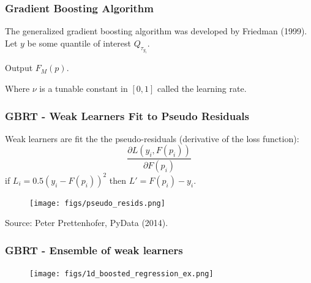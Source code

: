 \documentclass[t, pdftex]{beamer}
\begin{document}
\begin{frame}[shrink=20]
\frametitle{Gradient Boosting Algorithm}

The generalized gradient boosting algorithm was developed by Friedman (1999).
Let $y$ be some quantile of interest $Q_{\tau_{y_i}}$.
\begin{algorithm}[H]

Output $F_M(p).$
\end{algorithm}
Where $\nu$ is a tunable constant in $[0, 1]$ called the learning rate.
\end{frame}

\begin{frame}[noframenumbering]
\frametitle{GBRT - Weak Learners Fit to Pseudo Residuals}
Weak learners are fit the the pseudo-residuals (derivative of the loss function): 
\[
\frac{\partial L(y_i, F(p_i))}{\partial F(p_i)}
\]
if $L_i=0.5(y_i-F(p_i))^2$ then $L' = F(p_i)-y_i$.  
\begin{figure}[!htbp]
\centering
\texttt{[image: figs/pseudo\_resids.png]}
\label{model_overview}
\end{figure}
Source: Peter Prettenhofer, PyData (2014).
\end{frame}

\begin{frame}[noframenumbering]
\frametitle{GBRT - Ensemble of weak learners}

\begin{figure}[!htbp]
\centering
\texttt{[image: figs/1d\_boosted\_regression\_ex.png]}
\label{model_overview}
\end{figure}
\end{frame}
\end{document}
